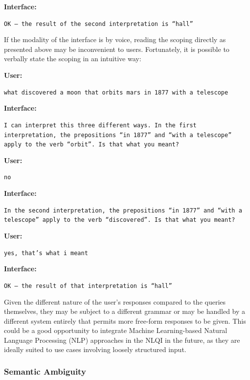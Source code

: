 \documentclass[../main.tex]{subfiles}
\begin{document}
\begin{refsection}
\noindent \textbf{Interface:}

\texttt{OK -- the result of the second interpretation is ``hall''}

\examplespacing

\noindent If the modality of the interface is by voice, reading the scoping directly as presented above may be inconvenient to users.  Fortunately, it is possible to verbally state the scoping in an intuitive way:

\examplespacing

\noindent \textbf{User:}

\texttt{what discovered a moon that orbits mars in 1877 with a telescope}

\noindent \textbf{Interface:}

\texttt{I can interpret this three different ways. In the first interpretation, the prepositions ``in 1877'' and ``with a telescope'' apply to the verb ``orbit''.  Is that what you meant?}

\noindent \textbf{User:}

\texttt{no}

\noindent \textbf{Interface:}

\texttt{In the second interpretation, the prepositions ``in 1877'' and \linebreak ``with a telescope'' apply to the verb ``discovered''.
	Is that	\linebreak what you meant?}

\noindent \textbf{User:}

\texttt{yes, that's what i meant}

\noindent \textbf{Interface:}

\texttt{OK -- the result of that interpretation is ``hall''}

\examplespacing

\noindent Given the different nature of the user's responses compared to the queries themselves, they may be subject to a different grammar or may be handled by a different system entirely that permits more free-form responses to be given. This could be a good opportunity to integrate Machine Learning-based Natural Language Processing (NLP) approaches in the NLQI in the future, as they are ideally suited to use cases involving loosely structured input.

\subsubsection{Semantic Ambiguity}


\end{refsection}
\end{document}
